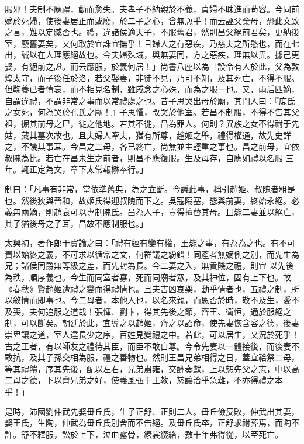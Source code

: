 \begin{pinyinscope}
 服邪！夫制不應禮，動而愈失。夫孝子不納親於不義，貞婦不昧進而茍容。今同前嫡於死婦，使後妻居正而或廢，於二子之心，曾無恧乎！而云誣父棄母，恐此文致之言，難以定臧否也。禮，違諸侯適天子，不服舊君，然則昌父絕前君矣，更納後室，廢舊妻矣，又何取於宜誅宜撫乎！且婦人之有惡疾，乃慈夫之所愍也，而在七出，誠以在人理應絕故也。今夫婦殊域，與無妻同，方之惡疾，理無以異。據己更娶，有絕前之證。而云應服，於義何居！」尚書八座以為「設令有人於此，父為敦煌太守，而子後任於洛，若父娶妻，非徒不見，乃可不知，及其死亡，不得不服。
 但鞠養已者情哀，而不相見名制，雖戚念之心殊，而為之服一也。又，兩后匹嫡，自謂違禮，不謂非常之事而以常禮處之也。昔子思哭出母於廟，其門人曰：『庶氏之女死，何為哭於孔氏之廟！』子思懼，改哭於他室。若昌不制服，不得不告其父祖，掘其前母之尸，徙之他地。若其不徙，昌為罪人。何則？異族之女不得祔于先姑，藏其墓次故也。且夫婦人牽夫，猶有所尊，趙姬之舉，禮得權通，故先史詳之，不譏其事耳。今昌之二母，各已終亡，尚無並主輕重之事也。昌之前母，宜依叔隗為比。若亡在昌未生之前者，則昌不應復服。生及母存，自應如禮以名服
 三年。輒正定為文，章下太常報楙奉行。」



 制曰：「凡事有非常，當依準舊典，為之立斷。今議此事，稱引趙姬、叔隗者粗是也。然後狄與晉和，故姬氏得迎叔隗而下之。吳寇隔塞，毖與前妻，終始永絕。必義無兩嫡，則趙衰可以專制隗氏。昌為人子，豈得擅替其母。且毖二妻並以絕亡，其子猶後母之子耳，昌故不應制服也。」



 太興初，著作郎干寶論之曰：「禮有經有變有權，王毖之事，有為為之也。有不可責以始終之義，不可求以循常之文，何群議之紛錯！同產者無嫡側之別，而先生為兄；諸侯同爵無等級之差，而先封為長。今二妻之入，無貴賤之禮，則宜
 以先後為秩，順序義也。今生而同室者寡，死而同廟者眾，及其神位，固有上下也。故《春秋》賢趙姬遭禮之變而得禮情也。且夫吉凶哀樂，動乎情者也，五禮之制，所以敘情而即事也。今二母者，本他人也，以名來親，而恩否於時，敬不及生，愛不及喪，夫何追服之道哉！張惲、劉卞，得其先後之節，齊王、衛恒，通於服絕之制，可以斷矣。朝廷於此，宜導之以趙姬，齊之以詔命，使先妻恢含容之德，後妻崇卑讓之道，室人達長少之序，百姓見變禮之中。若此，可以居生，又況於死乎！古之王者，有以師友之禮待其臣，而臣不敢自尊。今令先妻以一體接後，而後妻不
 敢抗，及其子孫交相為服，禮之善物也。然則王昌兄弟相得之日，蓋宜祫祭二母，等其禮饋，序其先後，配以左右，兄弟肅雍，交酬奏獻，上以恕先父之志，中以高二母之德，下以齊兄弟之好，使義風弘于王教，慈讓洽乎急難，不亦得禮之本乎！」



 是時，沛國劉仲武先娶毌丘氏，生子正舒、正則二人。毌丘儉反敗，仲武出其妻，娶王氏，生陶，仲武為毌丘氏別舍而不告絕。及毌丘氏卒，正舒求祔葬焉，而陶不許。舒不釋服，訟於上下，泣血露骨，縗裳綴絡，數十年弗得從，以至死亡。




\end{pinyinscope}
